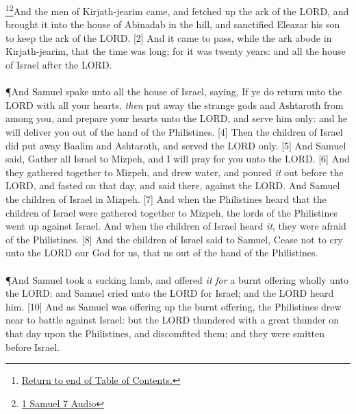 \footnote{\textcolor[cmyk]{0.99998,1,0,0}{\hyperlink{TOC}{Return to end of Table of Contents.}}}\footnote{\href{https://audiobible.com/bible/1_samuel_7.html}{\textcolor[cmyk]{0.99998,1,0,0}{1 Samuel 7 Audio}}}\textcolor[cmyk]{0.99998,1,0,0}{And the men of Kirjath-jearim came, and fetched up the ark of the LORD, and brought it into the house of Abinadab in the hill, and sanctified Eleazar his son to keep the ark of the LORD.}
[2] \textcolor[cmyk]{0.99998,1,0,0}{And it came to pass, while the ark abode in Kirjath-jearim, that the time was long; for it was twenty years: and all the house of Israel  after the LORD.}\\
\\
\P \textcolor[cmyk]{0.99998,1,0,0}{And Samuel spake unto all the house of Israel, saying, If ye do return unto the LORD with all your hearts, \emph{then} put away the strange gods and Ashtaroth from among you, and prepare your hearts unto the LORD, and serve him only: and he will deliver you out of the hand of the Philistines.}
[4] \textcolor[cmyk]{0.99998,1,0,0}{Then the children of Israel did put away Baalim and Ashtaroth, and served the LORD only.}
[5] \textcolor[cmyk]{0.99998,1,0,0}{And Samuel said, Gather all Israel to Mizpeh, and I will pray for you unto the LORD.}
[6] \textcolor[cmyk]{0.99998,1,0,0}{And they gathered together to Mizpeh, and drew water, and poured \emph{it} out before the LORD, and fasted on that day, and said there,  against the LORD. And Samuel  the children of Israel in Mizpeh.}
[7] \textcolor[cmyk]{0.99998,1,0,0}{And when the Philistines heard that the children of Israel were gathered together to Mizpeh, the lords of the Philistines went up against Israel. And when the children of Israel heard \emph{it}, they were afraid of the Philistines.}
[8] \textcolor[cmyk]{0.99998,1,0,0}{And the children of Israel said to Samuel, Cease not to cry unto the LORD our God for us, that us out of the hand of the Philistines.}\\
\\
\P \textcolor[cmyk]{0.99998,1,0,0}{And Samuel took a sucking lamb, and offered \emph{it} \emph{for} a burnt offering wholly unto the LORD: and Samuel cried unto the LORD for Israel; and the LORD heard him.}
[10] \textcolor[cmyk]{0.99998,1,0,0}{And as Samuel was offering up the burnt offering, the Philistines drew near to battle against Israel: but the LORD thundered with a great thunder on that day upon the Philistines, and discomfited them; and they were smitten before Israel.}
